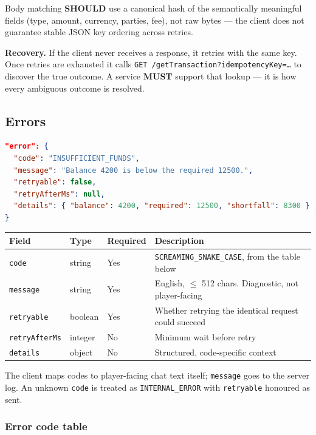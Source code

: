 \documentclass[11pt,a4paper]{article}
\newcommand{\code}[1]{\texttt{\small #1}}
\newcommand{\req}{\textbf{MUST}}
\newcommand{\rec}{\textbf{SHOULD}}
\newcommand{\keybox}[2]{%
  \par\vspace{0.5em}\noindent
  \colorbox{#1}{%
    \begin{minipage}{\dimexpr\linewidth-2\fboxsep\relax}
    \vspace{0.35em}\small #2\vspace{0.35em}
    \end{minipage}}%
  \par\vspace{0.5em}}
\newcommand{\note}[1]{\keybox{omceWash}{#1}}
\begin{document}
Body matching \rec{} use a canonical hash of the semantically meaningful fields (type, amount,
currency, parties, fee), not raw bytes --- the client does not guarantee stable JSON key ordering
across retries.

\note{\textbf{Recovery.} If the client never receives a response, it retries with the same key.
Once retries are exhausted it calls \code{GET /getTransaction?idempotencyKey=\ldots} to discover the
true outcome. A service \req{} support that lookup --- it is how every ambiguous outcome is
resolved.}

\subsection{Errors}
\label{sec:errors}

\begin{lstlisting}[language=json]
"error": {
  "code": "INSUFFICIENT_FUNDS",
  "message": "Balance 4200 is below the required 12500.",
  "retryable": false,
  "retryAfterMs": null,
  "details": { "balance": 4200, "required": 12500, "shortfall": 8300 }
}
\end{lstlisting}

\begin{tabularx}{\linewidth}{L{2.7cm} L{1.7cm} L{1.7cm} X}
\toprule
\textbf{Field} & \textbf{Type} & \textbf{Required} & \textbf{Description}\\
\midrule
\code{code}         & string  & Yes & \code{SCREAMING\_SNAKE\_CASE}, from the table below\\
\code{message}      & string  & Yes & English, $\leq$ 512 chars. Diagnostic, not player-facing\\
\code{retryable}    & boolean & Yes & Whether retrying the identical request could succeed\\
\code{retryAfterMs} & integer & No  & Minimum wait before retry\\
\code{details}      & object  & No  & Structured, code-specific context\\
\bottomrule
\end{tabularx}

The client maps codes to player-facing chat text itself; \code{message} goes to the server log. An
unknown \code{code} is treated as \code{INTERNAL\_ERROR} with \code{retryable} honoured as sent.

\subsubsection*{Error code table}
\end{document}

